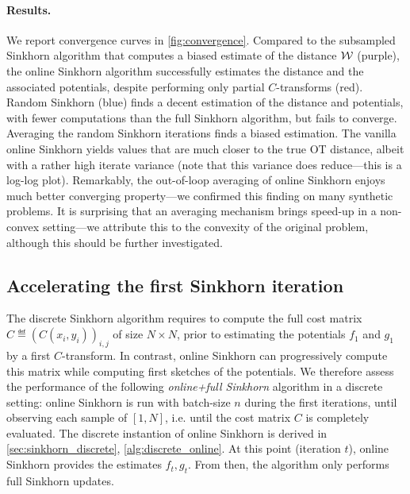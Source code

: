 \paragraph{Results.} We report convergence curves in \autoref{fig:convergence}.
Compared to the subsampled Sinkhorn algorithm that computes a biased estimate of
the distance $\mathcal{W}$ (purple), the online Sinkhorn algorithm successfully
estimates the distance and the associated potentials, despite performing only
partial $C$-transforms (red). Random Sinkhorn (blue) finds a decent estimation
of the distance and potentials, with fewer computations than the full Sinkhorn
algorithm, but fails to converge. Averaging the random Sinkhorn iterations finds
a biased estimation. The vanilla online Sinkhorn yields values that are much
closer to the true OT distance, albeit with a rather high iterate variance (note
that this variance does reduce---this is a log-log plot). Remarkably, the
out-of-loop averaging of online Sinkhorn enjoys much better converging
property---we confirmed this finding on many synthetic problems. It is
surprising that an averaging mechanism brings speed-up in a non-convex
setting---we attribute this to the convexity of the original problem, although
this should be further investigated.


\subsection{Accelerating the first Sinkhorn iteration}\label{sec:accelerating}

The discrete Sinkhorn algorithm requires to compute the full cost matrix $\hat C \eqdef
(C(x_i,y_i))_{i,j}$  of size $N \times N$, prior to estimating the
potentials $f_1$ and $g_1$ by a first $C$-transform. In contrast, online Sinkhorn can progressively
compute this matrix while computing first sketches of the potentials. We therefore
assess the performance of the following \textit{online+full Sinkhorn} algorithm
in a discrete setting: online Sinkhorn is run with batch-size $n$ during the first iterations, until
observing each sample of $[1,N]$, i.e. until the cost matrix $C$ is completely evaluated. The discrete instantion of online Sinkhorn is derived in \autoref{sec:sinkhorn_discrete}, \autoref{alg:discrete_online}. 
At this point (iteration $t$), online Sinkhorn provides the estimates $f_{t},
g_{t}$. From then, the algorithm only performs full Sinkhorn updates.


